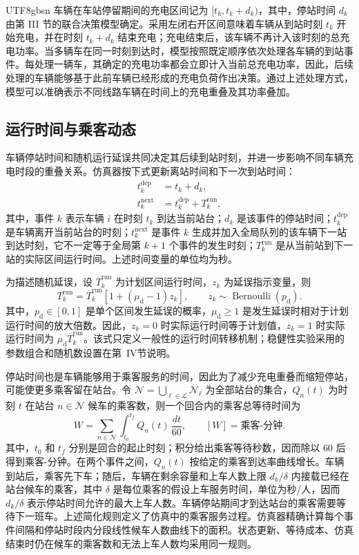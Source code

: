 \documentclass[conference]{IEEEtran}
\begin{document}
\begin{CJK*}{UTF8}{gbsn}
车辆在车站停留期间的充电区间记为 \([t_k,t_k+d_k)\)，其中，停站时间 \(d_k\) 由第 III 节的联合决策模型确定。采用左闭右开区间意味着车辆从到站时刻 \(t_k\) 开始充电，并在时刻 \(t_k+d_k\) 结束充电；充电结束后，该车辆不再计入该时刻的总充电功率。当多辆车在同一时刻到达时，模型按照既定顺序依次处理各车辆的到站事件。每处理一辆车，其确定的充电功率都会立即计入当前总充电功率，因此，后续处理的车辆能够基于此前车辆已经形成的充电负荷作出决策。通过上述处理方式，模型可以准确表示不同线路车辆在时间上的充电重叠及其功率叠加。

\subsection{运行时间与乘客动态}
车辆停站时间和随机运行延误共同决定其后续到站时刻，并进一步影响不同车辆充电时段的重叠关系。仿真器按下式更新离站时间和下一次到站时间：
\begin{align}
    t^{\mathrm{dep}}_k &= t_k + d_k, \\
    t^{\mathrm{next}}_k &= t^{\mathrm{dep}}_k + T^{\mathrm{run}}_{k},
\end{align}
其中，事件 $k$ 表示车辆 $i$ 在时刻 $t_k$ 到达当前站台；$d_k$ 是该事件的停站时间；$t^{\mathrm{dep}}_k$ 是车辆离开当前站台的时刻；$t^{\mathrm{next}}_k$ 是事件 $k$ 生成并加入全局队列的该车辆下一站到达时刻，它不一定等于全局第 $k+1$ 个事件的发生时刻；$T^{\mathrm{run}}_k$ 是从当前站到下一站的实际区间运行时间。上述时间变量的单位均为秒。

为描述随机延误，设 $\overline{T}^{\mathrm{run}}_k$ 为计划区间运行时间，$z_k$ 为延误指示变量，则
\begin{equation}
 T^{\mathrm{run}}_k=\overline{T}^{\mathrm{run}}_k
 \left[1+(\mu_{\mathrm d}-1)z_k\right],
 \qquad z_k\sim\operatorname{Bernoulli}(p_{\mathrm d}).
\end{equation}
其中，$p_{\mathrm d}\in[0,1]$ 是单个区间发生延误的概率，$\mu_{\mathrm d}\geq1$ 是发生延误时相对于计划运行时间的放大倍数。因此，$z_k=0$ 时实际运行时间等于计划值，$z_k=1$ 时实际运行时间为 $\mu_{\mathrm d}\overline{T}^{\mathrm{run}}_k$。该式只定义一般性的运行时间转移机制；稳健性实验采用的参数组合和随机数设置在第~IV节说明。

停站时间也是车辆能够用于乘客服务的时间，因此为了减少充电重叠而缩短停站，可能使更多乘客留在站台。令 $\mathcal{N}=\bigcup_{\ell\in\mathcal{L}}\mathcal{N}_{\ell}$ 为全部站台的集合，$Q_n(t)$ 为时刻 $t$ 在站台 $n\in\mathcal{N}$ 候车的乘客数，则一个回合内的乘客总等待时间为
\begin{equation}
 W=\sum_{n\in\mathcal{N}}\int_{t_0}^{t_f}Q_n(t)\,\frac{dt}{60},
 \qquad [W]=\text{乘客-分钟}.
\end{equation}
其中，$t_0$ 和 $t_f$ 分别是回合的起止时刻；积分给出乘客等待秒数，因而除以 60 后得到乘客-分钟。在两个事件之间，$Q_n(t)$ 按给定的乘客到达率曲线增长。车辆到站后，乘客先下车；随后，车辆在剩余容量和上车人数上限 $d_k/\delta$ 内接载已经在站台候车的乘客，其中 $\delta$ 是每位乘客的假设上车服务时间，单位为秒/人，因而 $d_k/\delta$ 表示停站时间允许的最大上车人数。车辆停站期间才到达站台的乘客需要等待下一班车。上述简化规则定义了仿真中的乘客服务过程。仿真器精确计算每个事件间隔和停站时段内分段线性候车人数曲线下的面积。状态更新、等待成本、仿真结束时仍在候车的乘客数和无法上车人数均采用同一规则。


\end{CJK*}
\end{document}
